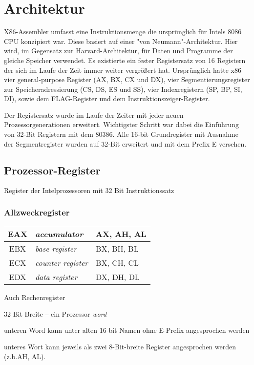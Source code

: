 \section{Architektur}
X86-Assembler umfasst eine Instruktionsmenge die ursprünglich für Intels 8086 CPU konzipiert war. Diese basiert auf einer "von Neumann"-Architektur. Hier wird, im Gegensatz zur Harvard-Architektur, für Daten und Programme der gleiche Speicher verwendet. Es existierte ein fester Registersatz von 16 Registern der sich im Laufe der Zeit immer weiter vergrößert hat. Ursprünglich hatte x86 vier general-purpose Register (AX, BX, CX und DX), vier Segmentierungsregister zur Speicheradressierung (CS, DS, ES und SS), vier Indexregistern (SP, BP, SI, DI), sowie dem FLAG-Register und dem Instruktionszeiger-Register.

Der Registersatz wurde im Laufe der Zeiter mit jeder neuen Prozessorgenerationen erweitert. Wichtigster Schritt war dabei die Einführung von 32-Bit Registern mit dem 80386. Alle 16-bit Grundregister mit Ausnahme der Segmentregister wurden auf 32-Bit erweitert und mit dem Prefix E versehen.

\subsection{Prozessor-Register}

Register der Intelprozessoren mit 32 Bit Instruktionssatz

\subsubsection{Allzweckregister}

\begin{tabular}{|c|l|l|}
\hline EAX & \emph{accumulator} & AX, AH, AL
\\
\hline EBX & \emph{base register} & BX, BH, BL
\\
\hline ECX & \emph{counter register} & BX, CH, CL
\\
\hline EDX & \emph{data register} & DX, DH, DL
\\
\hline \end{tabular}

Auch Rechenregister

32 Bit Breite – ein Prozessor \emph{word}

unteren Word kann unter alten 16-bit Namen ohne E-Prefix angesprochen werden

unteres Wort kann jeweils als zwei 8-Bit-breite Register angesprochen werden (z.b.AH, AL).

